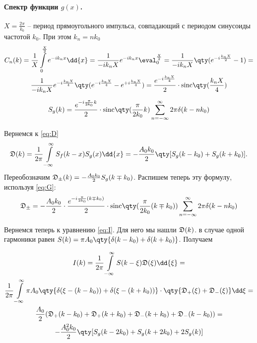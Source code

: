 \documentclass[a4paper,14pt]{extarticle}
\begin{document}
\paragraph{Спектр функции $g(x)$.}%
$X = \frac{2\pi}{k_{0}}$ -- период прямоугольного импульса, совпадающий с
периодом синусоиды частотой 
$k_0$. При этом $k_n = n k_0$
\newcommand{\sinc}[1]{\textrm{sinc}\qty(#1)}
\begin{gather}
    C_n(k) = \frac{1}{X} \int\limits_{0}^{\frac{X}{2}} e^{-i k_n x} \dd{x} = 
    \frac{1}{- i k_n X} e^{-i k_n x} \eval_{0}^{\frac{X}{2}} =
    \frac{1}{- i k_n X} \qty( e^{-i \frac{k_n X}{2}} - 1) = \\
    \frac{1}{- i k_n X} e^{-i \frac{k_n X}{4}}\qty( e^{-i \frac{k_n X}{4}} - e^{+i \frac{k_n X}{4}}) = \frac{e^{-i \frac{k_n X}{4}}}{2} \cdot \sinc{\frac{k_n X}{4}}
\end{gather}

\begin{gather}
    \label{eq:G}
    S_g(k) =\frac{e^{-i  \frac{\pi}{2 k_0}  k} }{2}\cdot
    \sinc{\frac{\pi}{2k_{0}}k}\sum\limits_{n=-\infty}^{\infty}  2 \pi\delta(k - n
    k_0)
\end{gather}

Вернемся к \eqref{eq:D} 
\begin{equation}
    \label{eq:}
    \D(k) = \frac{1}{2 \pi} \int\limits_{-\infty}^{\infty} S_f(k-x) S_g(x)
    \dd{x} = - \frac{A_{0} k_{0}}{2} \qty[S_g(k-k_{0}) + S_g(k+k_{0})].
\end{equation}
Переобозначим $\mathfrak{D}_{\pm}(k) = - \frac{A_{0} k_{0}}{2} S_g(k \mp k_{0})$.
Распишем теперь эту формулу, используя \eqref{eq:G}:
\begin{equation}
    \label{eq:}
    \D_{\pm} = -\frac{A_{0}k_{0}}{2} \cdot \frac{e^{-i  \frac{\pi}{2 k_0}
    (k\mp k_{0})} }{2}\cdot
    \sinc{\frac{\pi}{2k_{0}}(k\mp k_{0})}\sum\limits_{n=-\infty}^{\infty} 2\pi  \delta(k - n
    k_0)
\end{equation}

Вернемся теперь к уравнению \eqref{eq:I}. 
Для него мы нашли $\mathfrak{D}(k)$.
в случае одной гармоники равен  $S(k) = \pi A_0 \qty{\delta(k-k_{0}) +
\delta(k+k_{0})}$.
Получаем


\begin{gather}
    I(k) = \frac{1}{2\pi} \int\limits_{-\infty}^{\infty}  S(k-\xi)
    \D(\xi)\dd{\xi} = \\
    \frac{1}{2\pi} \int\limits_{-\infty}^{\infty} \pi A_{0}\qty{
    \delta(\xi- (k-k_{0}) ) + \delta(\xi - (k+k_{0})) } 
    \cdot \qty{\D_{+}(\xi) + \D_{-}(\xi)} \dd \xi = \\
    \frac{A_{0}}{2} (
    \D_{+}(k-k_{0}) +
    \D_{+}(k+k_{0}) +
    \D_{-}(k+k_{0}) +
    \D_{-}(k-k_{0}) 
    ) = \\
    -\frac{A_{0}^2 k_{0}}{2} \qty[
    S_g(k-2k_{0}) +
    S_g(k+2k_{0}) +
    2S_g(k)
    ]
\end{gather}
\end{document}
